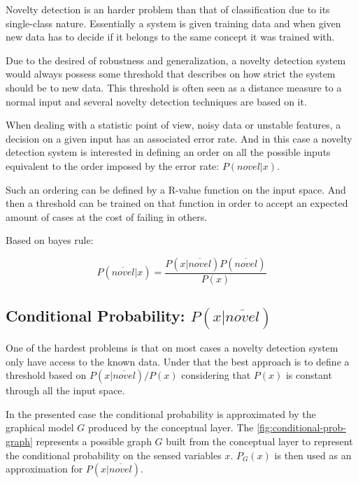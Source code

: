 \documentclass[runningheads,a4paper]{llncs}
\begin{document}
Novelty detection is an harder problem than that of classification due to its single-class nature.
Essentially a system is given training data and when given new data has to decide if it belongs
to the same concept it was trained with.

Due to the desired of robustness and generalization, a novelty detection system would always possess
some threshold that describes on how strict the system should be to new data.
This threshold is often seen as a distance measure to a normal input and several novelty detection
techniques are based on it.

When dealing with a statistic point of view, noisy data or unstable features, a decision on a given input has
an associated error rate. And in this case a novelty detection system is interested in defining an order
on all the possible inputs equivalent to the order imposed by the error rate: $P(novel|x)$.

Such an ordering can be defined by a R-value function on the input space. And then a threshold can be trained
on that function in order to accept an expected amount of cases at the cost of failing in others.

Based on bayes rule:

\begin{equation}
P(\overline{novel}|x) = \frac{P(x|\overline{novel}) P(\overline{novel})}{P(x)}
\end{equation}

\subsection{Conditional Probability: $P(x|\overline{novel})$}
\label{sec:uniform-unconditional}

One of the hardest problems is that on most cases a novelty detection system only have access to 
the known data.
Under that the best approach is to define a threshold based on $P(x|\overline{novel})/P(x)$
considering that $P(x)$ is constant through all the input space.

In the presented case the conditional probability is approximated by the graphical model $G$
produced by the conceptual layer.
The \autoref{fig:conditional-prob-graph} represents a possible graph $G$ built from the conceptual
layer to represent the conditional probability on the sensed variables $x$.
$P_G(x)$ is then used as an approximation for $P(x|\overline{novel})$.
\end{document}
